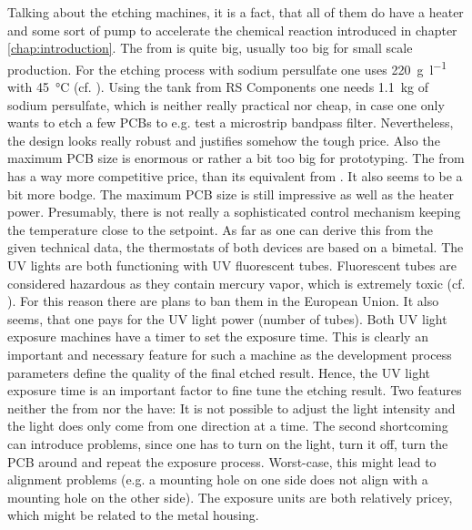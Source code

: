 Talking about the etching machines, it is a fact, that all of them do have a heater and some sort of pump to accelerate the chemical reaction introduced in chapter \ref{chap:introduction}. 
\newpar
The  from  is quite big, usually too big for small scale production. For the etching process with sodium persulfate one uses \SI{220}{\gram\per\litre} with \SI{45}{\celsius} (cf. \cite{online:aetzen}). Using the tank from RS Components one needs \SI{1.1}{\kilo\gram} of sodium persulfate, which is neither really practical nor cheap, in case one only wants to etch a few \glspl{PCB} to e.g. test a microstrip bandpass filter. Nevertheless, the design looks really robust and justifies somehow the tough price. Also the maximum \gls{PCB} size is enormous or rather a bit too big for prototyping.
\newpar
The  from  has a way more competitive price, than its equivalent from . It also seems to be a bit more bodge. The maximum \gls{PCB} size is still impressive as well as the heater power. 
\newpar
Presumably, there is not really a sophisticated control mechanism keeping the temperature close to the setpoint. As far as one can derive this from the given technical data, the thermostats of both devices are based on a bimetal.
\newpar
The \gls{UV} lights are both functioning with \gls{UV} fluorescent tubes. Fluorescent tubes are considered hazardous as they contain mercury vapor, which is extremely toxic (cf. \cite{online:tubes}). For this reason there are plans to ban them in the European Union. It also seems, that one pays for the \gls{UV} light power (number of tubes).
\newpar
Both \gls{UV} light exposure machines have a timer to set the exposure time. This is clearly an important and necessary feature for such a machine as the development process parameters define the quality of the final etched result. Hence, the \gls{UV} light exposure time is an important factor to fine tune the etching result. 
\newpar
Two features neither the  from  nor the  have: It is not possible to adjust the light intensity and the light does only come from one direction at a time. The second shortcoming can introduce problems, since one has to turn on the light, turn it off, turn the \gls{PCB} around and repeat the exposure process. Worst-case, this might lead to alignment problems (e.g. a mounting hole on one side does not align with a mounting hole on the other side). 
\newpar
The exposure units are both relatively pricey, which might be related to the metal housing. 
